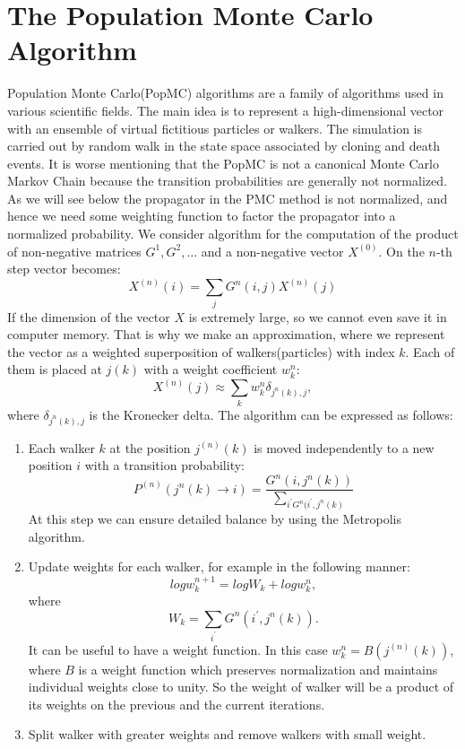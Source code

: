 \documentclass[twoside,english]{uiofysmaster}
\begin{document}
\section{The Population Monte Carlo Algorithm}
Population Monte Carlo(PopMC) algorithms are a family of algorithms used in various scientific fields. The main idea is to represent a high-dimensional vector with an ensemble of virtual fictitious particles or walkers. The simulation is carried out by random walk in the state space associated by cloning and death events. It is worse mentioning that the PopMC is not a canonical Monte Carlo Markov Chain because the transition probabilities are generally not normalized. As we will see below the propagator in the PMC method is not normalized, and hence we need some weighting function to factor the propagator into a normalized probability.
We consider algorithm for the computation of the product of non-negative matrices $G^1, G^2, \dots$ and a non-negative vector $X^{(0)}$. On the $n$-th step vector becomes:
\begin{equation}
X^{(n)}(i) = \sum_{j} G^n(i,j)X^{(n)}(j)
\end{equation}
If the dimension of the vector $X$ is extremely large, so we cannot even save it in computer memory. That is why we make an approximation, where we represent the vector as a weighted superposition of walkers(particles) with index $k$. Each of them is placed at $j(k)$ with a weight coefficient $w_k^n$:
\begin{equation}
X^{(n)}(j) \approx \sum_{k} w_k^n \delta_{j^n(k),j},
\end{equation}
where $\delta_{j^n(k),j}$ is the Kronecker delta. The algorithm can be expressed as follows:  
\begin{enumerate}
	
	\item 
	Each walker $k$ at the position $j^{(n)}(k)$ is moved independently to a new position $i$ with a transition probability:
	\begin{equation}
	P^{(n)}(j^n(k) \rightarrow i) = \frac{G^n(i, j^n(k))}{\sum_{i^\prime G^n(i^\prime, j^n(k)}}
	\end{equation}
	At this step we can ensure detailed balance by using the Metropolis algorithm.
	\item
	Update weights for each walker, for example in the following manner:
	\begin{equation}
	log w^{n+1}_k = log W_k + log w_k^n,
	\end{equation}
	where
	\begin{equation}
	W_k = \sum_{i^\prime} G^n(i^\prime, j^n(k)).
	\end{equation} 
	It can be useful to have a weight function. In this case $w_k^n = B(j^{(n)}(k))$, where $B$ is a weight function which preserves normalization and maintains individual weights close to unity. So the weight of walker will be a product of its weights on the previous and the current iterations.
	\item
	Split walker with greater weights and remove walkers with small weight.
\end{enumerate}	
\end{document}
